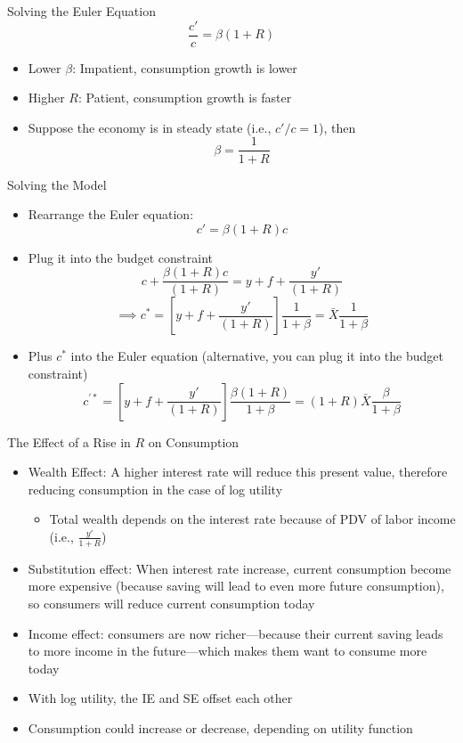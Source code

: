 \documentclass[aspectratio=1610]{beamer}
\begin{document}
\begin{frame}[wide]{Solving the Euler Equation}
	\[\frac{c'}{c} = \beta (1+R)\]
	\begin{itemize}
		\item Lower $\beta$: Impatient, consumption growth is lower
		\item Higher $R$: Patient, consumption growth is faster
		\item Suppose the economy is in steady state (i.e., $c'/c = 1$), then
		\[\beta= \frac{1}{1+R}\]
	\end{itemize}
\end{frame}

\begin{frame}[wide]{Solving the Model}
	\begin{itemize}
		\item Rearrange the Euler equation:
		\[c' = \beta (1+R)c\]
		\item Plug it into the budget constraint
		\[c+\frac{\beta (1+R)c}{(1+R)}  = y +f + \frac{y'}{(1+R)}\]
		\[\implies c^*  = \left[y +f + \frac{y'}{(1+R)}\right] \frac{1}{1+\beta} = \bar{X}\frac{1}{1+\beta}\]
		\item Plus $c^*$ into the Euler equation (alternative, you can plug it into the budget constraint)
		\[c^{'*} = \left[y +f + \frac{y'}{(1+R)}\right] \frac{\beta (1+R)}{1+\beta}= (1+R)\bar{X}\frac{\beta }{1+\beta}\]
	\end{itemize}
\end{frame}

\begin{frame}[wide]{The Effect of a Rise in $R$ on Consumption}
	\begin{itemize} 
		\item Wealth Effect: A higher interest rate will reduce this present value, therefore reducing consumption in the case of log utility
		\begin{itemize}
			\item Total wealth depends on the interest rate because of PDV of labor income (i.e., $\frac{y'}{1+R}$)
		\end{itemize}
		\item Substitution effect: When interest rate increase, current consumption become more expensive (because saving will lead to even more future consumption), so consumers will reduce current consumption today
		\item Income effect: consumers are now richer—because their current saving leads to more income in the future—which makes them want to consume more today
		\item With log utility, the IE and SE offset each other
		\item Consumption could increase or decrease, depending on utility function
	\end{itemize}
\end{frame}
\end{document}

